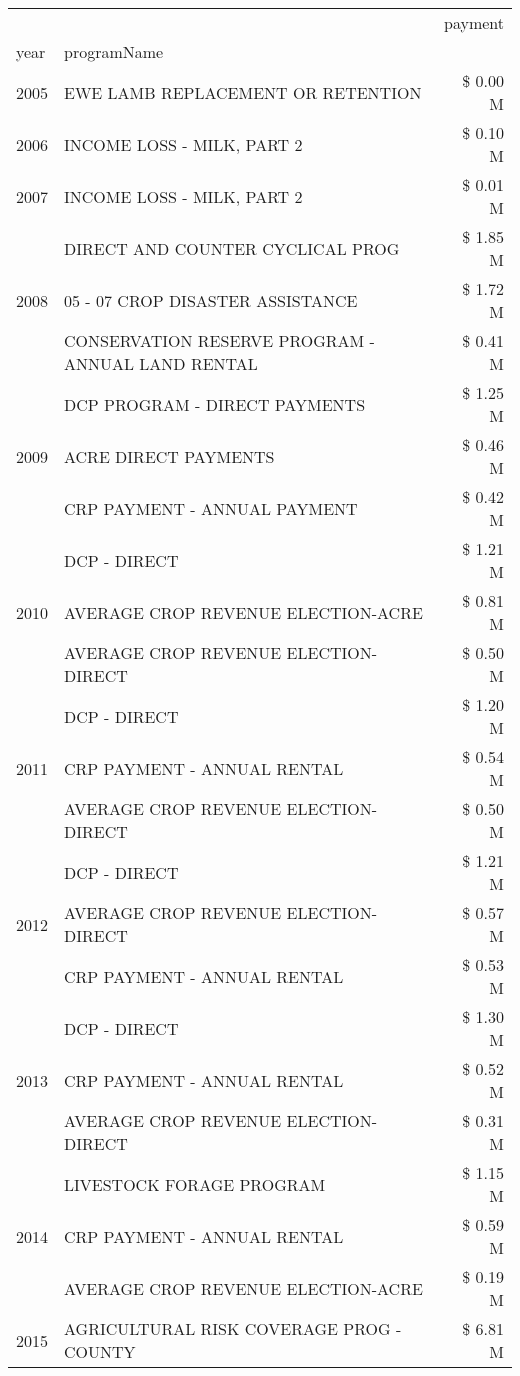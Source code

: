 \begin{tabular}{llr}
\toprule
 &  & payment \\
year & programName &  \\
\midrule
2005 & EWE LAMB REPLACEMENT OR RETENTION & \$ 0.00 M \\
\cline{1-3}
2006 & INCOME LOSS - MILK, PART 2 & \$ 0.10 M \\
\cline{1-3}
2007 & INCOME LOSS - MILK, PART 2 & \$ 0.01 M \\
\cline{1-3}
\multirow[t]{3}{*}{2008} & DIRECT AND COUNTER CYCLICAL PROG & \$ 1.85 M \\
 & 05 - 07 CROP DISASTER ASSISTANCE & \$ 1.72 M \\
 & CONSERVATION RESERVE PROGRAM - ANNUAL LAND RENTAL & \$ 0.41 M \\
\cline{1-3}
\multirow[t]{3}{*}{2009} & DCP PROGRAM - DIRECT PAYMENTS & \$ 1.25 M \\
 & ACRE DIRECT PAYMENTS & \$ 0.46 M \\
 & CRP PAYMENT - ANNUAL PAYMENT & \$ 0.42 M \\
\cline{1-3}
\multirow[t]{3}{*}{2010} & DCP - DIRECT & \$ 1.21 M \\
 & AVERAGE CROP REVENUE ELECTION-ACRE & \$ 0.81 M \\
 & AVERAGE CROP REVENUE ELECTION-DIRECT & \$ 0.50 M \\
\cline{1-3}
\multirow[t]{3}{*}{2011} & DCP - DIRECT & \$ 1.20 M \\
 & CRP PAYMENT - ANNUAL RENTAL & \$ 0.54 M \\
 & AVERAGE CROP REVENUE ELECTION-DIRECT & \$ 0.50 M \\
\cline{1-3}
\multirow[t]{3}{*}{2012} & DCP - DIRECT & \$ 1.21 M \\
 & AVERAGE CROP REVENUE ELECTION-DIRECT & \$ 0.57 M \\
 & CRP PAYMENT - ANNUAL RENTAL & \$ 0.53 M \\
\cline{1-3}
\multirow[t]{3}{*}{2013} & DCP - DIRECT & \$ 1.30 M \\
 & CRP PAYMENT - ANNUAL RENTAL & \$ 0.52 M \\
 & AVERAGE CROP REVENUE ELECTION-DIRECT & \$ 0.31 M \\
\cline{1-3}
\multirow[t]{3}{*}{2014} & LIVESTOCK FORAGE PROGRAM & \$ 1.15 M \\
 & CRP PAYMENT - ANNUAL RENTAL & \$ 0.59 M \\
 & AVERAGE CROP REVENUE ELECTION-ACRE & \$ 0.19 M \\
\cline{1-3}
\multirow[t]{3}{*}{2015} & AGRICULTURAL RISK COVERAGE PROG - COUNTY & \$ 6.81 M \\

\end{tabular}
